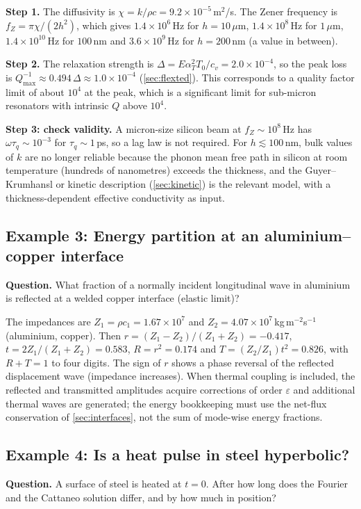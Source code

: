 \textbf{Step 1.} The diffusivity is $\chi=k/\rho c=9.2\times10^{-5}$\,m$^2$/s. The Zener frequency is $f_Z=\pi\chi/(2h^2)$, which gives $1.4\times10^{6}$\,Hz for $h=10\,\mu$m, $1.4\times10^{8}$\,Hz for $1\,\mu$m, $1.4\times10^{10}$\,Hz for $100$\,nm and $3.6\times10^{9}$\,Hz for $h=200$\,nm (a value in between).

\textbf{Step 2.} The relaxation strength is $\Delta=E\alpha_T^2T_0/c_v=2.0\times10^{-4}$, so the peak loss is $Q^{-1}_{\max}\approx0.494\,\Delta\approx1.0\times10^{-4}$ (\cref{sec:flexted}). This corresponds to a quality factor limit of about $10^{4}$ at the peak, which is a significant limit for sub-micron resonators with intrinsic $Q$ above $10^{4}$.

\textbf{Step 3: check validity.} A micron-size silicon beam at $f_Z\sim10^{8}$\,Hz has $\omega\tau_q\sim10^{-3}$ for $\tau_q\sim1$\,ps, so a lag law is not required. For $h\lesssim100$\,nm, bulk values of $k$ are no longer reliable because the phonon mean free path in silicon at room temperature (hundreds of nanometres) exceeds the thickness, and the Guyer--Krumhansl or kinetic description (\cref{sec:kinetic}) is the relevant model, with a thickness-dependent effective conductivity as input.

\subsection{Example 3: Energy partition at an aluminium--copper interface}
\textbf{Question.} What fraction of a normally incident longitudinal wave in aluminium is reflected at a welded copper interface (elastic limit)?

The impedances are $Z_1=\rho c_1=1.67\times10^{7}$ and $Z_2=4.07\times10^{7}$\,kg\,m$^{-2}$s$^{-1}$ (aluminium, copper). Then $r=(Z_1-Z_2)/(Z_1+Z_2)=-0.417$, $t=2Z_1/(Z_1+Z_2)=0.583$, $R=r^2=0.174$ and $T=(Z_2/Z_1)t^2=0.826$, with $R+T=1$ to four digits. The sign of $r$ shows a phase reversal of the reflected displacement wave (impedance increases). When thermal coupling is included, the reflected and transmitted amplitudes acquire corrections of order $\varepsilon$ and additional thermal waves are generated; the energy bookkeeping must use the net-flux conservation of \cref{sec:interfaces}, not the sum of mode-wise energy fractions.

\subsection{Example 4: Is a heat pulse in steel hyperbolic?}
\textbf{Question.} A surface of steel is heated at $t=0$. After how long does the Fourier and the Cattaneo solution differ, and by how much in position?

